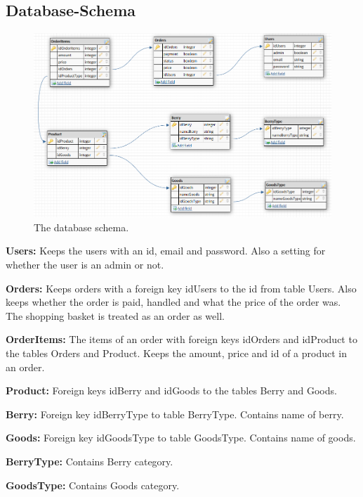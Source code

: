 \newpage

\subsection{Database-Schema}

\begin{figure}[H]
  \centering
  \includegraphics[width=\textwidth]{new_db_schema.PNG}
  \caption{\label{fig:schema} The database schema.}
\end{figure}


\textbf{Users:} Keeps the users with an id, email and password. Also a
setting for whether the user is an admin or not.

\noindent\textbf{Orders:} Keeps orders with a foreign key idUsers to the
id from table Users. Also keeps whether the order is paid, handled and what
the price of the order was. The shopping basket is treated as an order as well.

\noindent\textbf{OrderItems:} The items of an order with foreign keys
idOrders and idProduct to the tables Orders and Product.  Keeps the amount,
price and id of a product in an order.

\noindent\textbf{Product:} Foreign keys idBerry and idGoods to the tables
Berry and Goods.

\noindent\textbf{Berry:} Foreign key idBerryType to table BerryType. Contains
name of berry.

\noindent\textbf{Goods:} Foreign key idGoodsType to table GoodsType. Contains
name of goods.

\noindent\textbf{BerryType:} Contains Berry category.

\noindent\textbf{GoodsType:} Contains Goods category.
